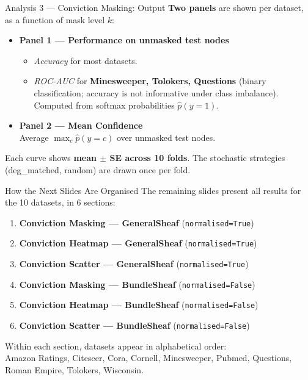 \documentclass[11pt]{beamer}
\begin{document}
\begin{frame}{Analysis 3 --- Conviction Masking: Output}
\textbf{Two panels} are shown per dataset, as a function of mask level $k$:
\bigskip
\begin{itemize}
    \setlength\itemsep{1em}
    \item \textbf{Panel 1 --- Performance on unmasked test nodes}
    \begin{itemize}
        \item \emph{Accuracy} for most datasets.
        \item \emph{ROC-AUC} for \textbf{Minesweeper, Tolokers, Questions} (binary classification; accuracy is not informative under class imbalance). Computed from softmax probabilities $\hat{p}(y=1)$.
    \end{itemize}
    \item \textbf{Panel 2 --- Mean Confidence}\\
    Average $\max_c \hat{p}(y=c)$ over unmasked test nodes.
\end{itemize}
\bigskip
Each curve shows \textbf{mean $\pm$ SE across 10 folds}. The stochastic strategies (deg\_matched, random) are drawn once per fold.
\end{frame}


\begin{frame}{How the Next Slides Are Organised}
The remaining slides present all results for the 10 datasets, in 6 sections:
\bigskip
\begin{enumerate}
    \setlength\itemsep{0.7em}
    \item \textbf{Conviction Masking --- GeneralSheaf} (\texttt{normalised=True})
    \item \textbf{Conviction Heatmap --- GeneralSheaf} (\texttt{normalised=True})
    \item \textbf{Conviction Scatter --- GeneralSheaf} (\texttt{normalised=True})
    \item \textbf{Conviction Masking --- BundleSheaf} (\texttt{normalised=False})
    \item \textbf{Conviction Heatmap --- BundleSheaf} (\texttt{normalised=False})
    \item \textbf{Conviction Scatter --- BundleSheaf} (\texttt{normalised=False})
\end{enumerate}
\bigskip
Within each section, datasets appear in alphabetical order:\\
Amazon Ratings, Citeseer, Cora, Cornell, Minesweeper, Pubmed, Questions, Roman Empire, Tolokers, Wisconsin.
\end{frame}
\end{document}
